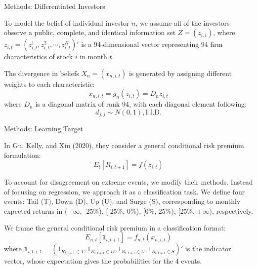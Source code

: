 \documentclass[11pt, aspectratio=169]{beamer}
\newenvironment{wideitemize}{\itemize\addtolength{\itemsep}{10pt}}{\enditemize}
\begin{document}
\begin{frame}{Methods: Differentiated Investors}
    \bigskip
    \begin{wideitemize}
    \item To model the belief of individual investor $n$, we assume all of the investors observe a \alert{public, complete, and identical} information set $Z = (z_{i, t})$, where $z_{i,t}=(z_{i,t}^{1},z_{i,t}^{2},\cdots,z_{i,t}^{K})'$ is a 94-dimensional vector representing 94 firm characteristics of stock $i$ in month $t$. 
    \item The divergence in beliefs $X_{n} = (x_{n,i,t})$ is generated by assigning different weights to each characteristic:
    \begin{equation*}
        x_{n,i,t} = g_n(z_{i,t}) = D_{n}z_{i,t}
    \end{equation*}
    where $D_{n}$ is a diagonal matrix of rank 94, with each diagonal element following:
    \begin{equation*}
        d_{j,j} \sim N(0,1), \text{I.I.D.}
    \end{equation*}
    \end{wideitemize}
\end{frame}

\begin{frame}{Methods: Learning Target}
    \bigskip
    \begin{wideitemize}
    \item In Gu, Kelly, and Xiu (2020), they consider a general conditional risk premium formulation:
    \begin{equation*}
        E_t[R_{i,t+1}] = f(z_{i,t})
    \end{equation*}
    \item To account for disagreement on extreme events, we modify their methods. \alert{Instead of focusing on regression, we approach it as a classification task}. We define four events: Tail (T), Down (D), Up (U), and Surge (S), corresponding to monthly expected returns in ($-\infty$, -25\%), [-25\%, 0\%), [0\%, 25\%), [25\%, $+\infty$), respectively.
    \item We frame the general conditional risk premium in a \alert{classification format}:
    \begin{equation*}
        E_{n,t}[\mathbf{1}_{i,t+1}] = f_{n,t}(x_{n,i,t})
    \end{equation*}
    where $\mathbf{1}_{i,t+1}=(1_{R_{i,t+1}\in T},
                  1_{R_{i,t+1}\in D},
                  1_{R_{i,t+1}\in U},
                  1_{R_{i,t+1}\in S})'$ is the indicator vector, whose expectation gives the probabilities for the 4 events.
    \end{wideitemize}
\end{frame}
\end{document}
